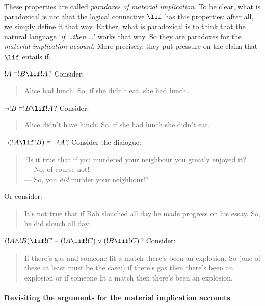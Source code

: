 \documentclass[../../../include/open-logic-section]{subfiles}
\begin{document}
These properties are called \emph{paradoxes of material implication}. To be clear, what is paradoxical is not that the logical connective $\lif$ has this properties: after all, we simply define it that way. Rather, what is paradoxical is to think that the natural language `\emph{if \ldots then \ldots}' works that way. So they are paradoxes for the \emph{material implication account}. More precisely, they put pressure on the claim that $\lif$ entails if. 

$!A \Entails !B \lif !A$? Consider:

\begin{quote}
	Alice had lunch. So, if she didn't eat, she had lunch.
\end{quote}

$\lnot !B \Entails !B \lif !A$? Consider:

\begin{quote}
	Alice didn't have lunch. So, if she had lunch she didn't eat.
\end{quote}

$\lnot (!A \lif !B) \Entails \lnot !A$? Consider the dialogue:

\begin{quote}
	``Is it true that if you murdered your neighbour you greatly enjoyed it?\\
	--- No, of course not!\\
	--- So, you \emph{did} murder your neighbour!''
\end{quote}

Or consider:

\begin{quote}
	It's not true that if Bob slouched all day he made progress on his essay. So, he did slouch all day.
\end{quote}

$(!A \land !B) \lif !C \Entails (!A \lif !C) \lor (!B \lif !C)$? Consider:

\begin{quote}
	If there's gas and someone lit a match there's been an explosion. So (one of these at least must be the case:) if there's gas then there's been an explosion or if someone lit a match then there's been an explosion.
\end{quote}

\paragraph*{Revisiting the arguments for the material implication accounts}
\end{document}
